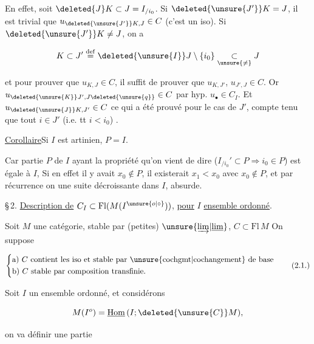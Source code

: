 En effet,  soit $\deleted{J}K\subset J=I_{/i_0}$. Si  $\deleted{\unsure{J'}}K=J$, il est trivial que $u_{\deleted{\unsure{J'}}K,J}\in C$ (c'est un iso). Si $\deleted{\unsure{J'}}K\ne J$, on a 

\[
 K\subset J'\overset{\mathrm{def}}{=}\deleted{\unsure{I}}J\setminus\{i_0\}\underset{\unsure{\ne}}{\subset}J
\]

et pour prouver que $u_{K,J}\in C$, il suffit de prouver que $u_{K,J'}$, $u_{J',J}\in C$. Or $u_{\deleted{\unsure{K}}J',J\deleted{\unsure{q}}}\in C$ par hyp. $u_\bullet\in C_I$. Et $u_{\deleted{\unsure{J}}K,J'}\in C$  ce qui a été prouvé pour le cas de $J'$, compte tenu que  tout $i\in J'$ (i.e. tt $i<i_0$)  .

 \uline{Corollaire}\qquad Si $I$ est artinien, $P=I$.

Car  partie $P$ de $I$ ayant la propriété qu'on vient de dire ($I_{/i_0}'\subset P\Longrightarrow i_0\in P$) est égale à $I$,  Si en effet il y avait $x_0\notin P$, il existerait $x_1<x_0$ avec $x_0\notin P$, et par récurrence on  une suite  décroissante dans $I$, absurde.



\S\,2. \uline{Description de} $C_I\subset\mathrm{Fl}(M(I^{\unsure{o|\circ}}))$, \uline{pour} $I$ \uline{ensemble ordonné}.

Soit $M$ une catégorie, stable par (petites) $\unsure{\underrightarrow{\lim}|\underline{\lim}}$, $C\subset\mathrm{Fl}\,M$  On suppose

\[
\left\{\begin{aligned}
 &\text{a) } C\text{ contient les iso et stable par \unsure{cochgmt|cochangement} de base}\\
 &\text{b) } C\text{ stable par composition transfinie.}
\end{aligned}\right. \tag*{(2.1.)}
\]

Soit $I$ un  ensemble ordonné, et considérons

\[
 M(I^o)=\underline{\mathrm{Hom}}\,(I;\deleted{\unsure{C}}M),
\]

on va définir une partie

